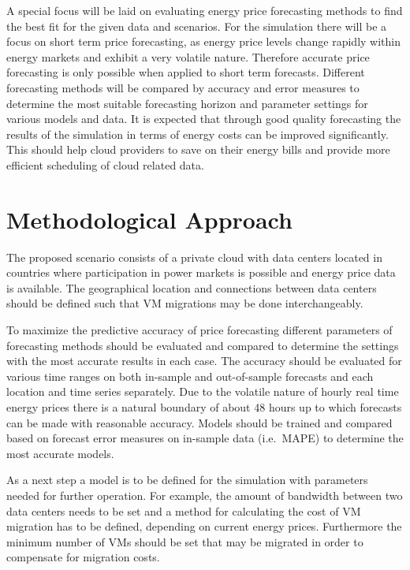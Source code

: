 A special focus will be laid on evaluating energy price forecasting methods to find the best fit for the given data and scenarios. For the simulation there will be a focus on short term price forecasting, as energy price levels change rapidly within energy markets and exhibit a very volatile nature. Therefore accurate price forecasting is only possible when applied to short term forecasts. 
Different forecasting methods will be compared by accuracy and error measures to determine the most suitable forecasting horizon and parameter settings for various models and data. It is expected that through good quality forecasting the results of the simulation in terms of energy costs can be improved significantly. This should help cloud providers to save on their energy bills and provide more efficient scheduling of cloud related data. 

\section{Methodological Approach}

The proposed scenario consists of a private cloud with data centers located in countries where participation in power markets is possible and energy price data is available. The geographical location and connections between data centers should be defined such that VM migrations may be done interchangeably. 

To maximize the predictive accuracy of price forecasting different parameters of forecasting methods should be evaluated and compared to determine the settings with the most accurate results in each case. The accuracy should be evaluated for various time ranges on both in-sample and out-of-sample forecasts and each location and time series separately. Due to the volatile nature of hourly real time energy prices there is a natural boundary of about 48 hours up to which forecasts can be made with reasonable accuracy. Models should be trained and compared based on forecast error measures on in-sample data (i.e.~MAPE) to determine the most accurate models. 

As a next step a model is to be defined for the simulation with parameters needed for further operation. For example, the amount of bandwidth between two data centers needs to be set and a method for calculating the cost of VM migration has to be defined, depending on current energy prices. Furthermore the minimum number of VMs should be set that may be migrated in order to compensate for migration costs. 


